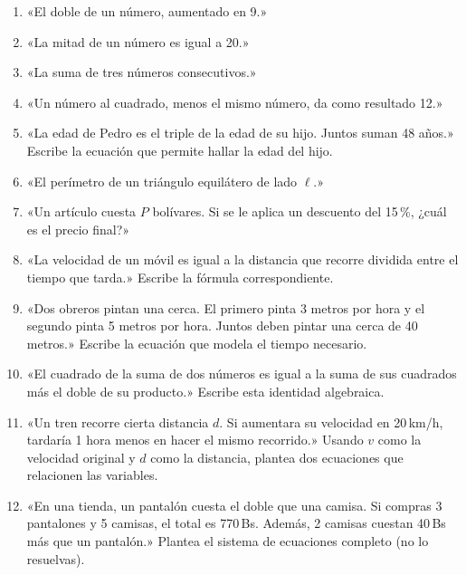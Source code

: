 \documentclass[12pt, letterpaper]{article}
\begin{document}
\begin{enumerate}[leftmargin=*, resume]
  \item \facil{} «El doble de un número, aumentado en 9.»

  \item \facil{} «La mitad de un número es igual a 20.»

  \item \facil{} «La suma de tres números consecutivos.»

  \item \facil{} «Un número al cuadrado, menos el mismo número, da como resultado 12.»

  \item \medio{} «La edad de Pedro es el triple de la edad de su hijo. Juntos suman 48 años.» Escribe la ecuación que permite hallar la edad del hijo.

  \item \medio{} «El perímetro de un triángulo equilátero de lado $\ell$.»

  \item \medio{} «Un artículo cuesta $P$ bolívares. Si se le aplica un descuento del 15\,\%, ¿cuál es el precio final?»

  \item \medio{} «La velocidad de un móvil es igual a la distancia que recorre dividida entre el tiempo que tarda.» Escribe la fórmula correspondiente.

  \item \medio{} «Dos obreros pintan una cerca. El primero pinta 3 metros por hora y el segundo pinta 5 metros por hora. Juntos deben pintar una cerca de 40 metros.» Escribe la ecuación que modela el tiempo necesario.

  \item \dificil{} «El cuadrado de la suma de dos números es igual a la suma de sus cuadrados más el doble de su producto.» Escribe esta identidad algebraica.

  \item \dificil{} «Un tren recorre cierta distancia $d$. Si aumentara su velocidad en 20\,km/h, tardaría 1 hora menos en hacer el mismo recorrido.» Usando $v$ como la velocidad original y $d$ como la distancia, plantea dos ecuaciones que relacionen las variables.

  \item \dificil{} «En una tienda, un pantalón cuesta el doble que una camisa. Si compras 3 pantalones y 5 camisas, el total es 770\,Bs. Además, 2 camisas cuestan 40\,Bs más que un pantalón.» Plantea el sistema de ecuaciones completo (no lo resuelvas).
\end{enumerate}
\end{document}

